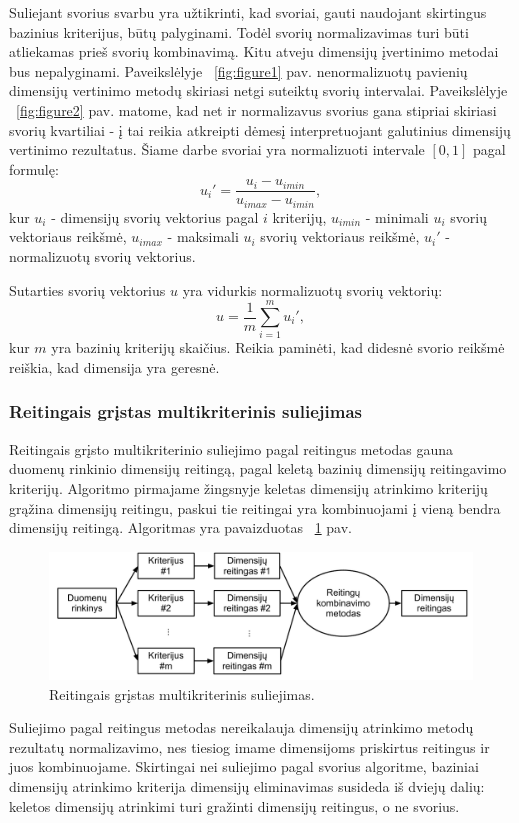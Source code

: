 Suliejant svorius svarbu yra užtikrinti, kad svoriai, gauti naudojant
skirtingus bazinius kriterijus, būtų palyginami. Todėl svorių normalizavimas
turi būti atliekamas prieš svorių kombinavimą. Kitu
atveju dimensijų įvertinimo metodai bus nepalyginami. Paveikslėlyje ~\ref{fig:figure1} pav.
nenormalizuotų pavienių dimensijų vertinimo metodų skiriasi netgi suteiktų
svorių intervalai. Paveikslėlyje ~\ref{fig:figure2} pav. matome,
kad net ir normalizavus svorius gana stipriai skiriasi svorių kvartiliai - į 
tai reikia atkreipti dėmesį interpretuojant galutinius dimensijų vertinimo 
rezultatus. Šiame darbe svoriai yra 
normalizuoti intervale $[0, 1]$ pagal formulę:
\begin{equation}
 u_i'=\frac{u_i - u_{i min}}{u_{i max} - u_{i min}}, 
\end{equation}
kur $u_i$ - dimensijų svorių vektorius pagal $i$ kriterijų, 
$u_{i min}$ - minimali $u_i$ svorių vektoriaus reikšmė,
$u_{i max}$ - maksimali $u_i$ svorių vektoriaus reikšmė,
$u_i'$ - normalizuotų svorių vektorius.

Sutarties svorių vektorius $u$ yra vidurkis normalizuotų svorių vektorių:
\begin{equation}
 u = \frac{1}{m}\sum_{i=1}^m u_i',
\end{equation}
kur $m$ yra bazinių kriterijų skaičius. Reikia paminėti, kad didesnė svorio
reikšmė reiškia, kad dimensija yra geresnė.

\subsubsection{Reitingais grįstas multikriterinis suliejimas}

Reitingais grįsto multikriterinio suliejimo pagal reitingus metodas gauna
duomenų rinkinio dimensijų reitingą,
pagal keletą bazinių dimensijų reitingavimo kriterijų. Algoritmo pirmajame žingsnyje
keletas dimensijų atrinkimo kriterijų grąžina dimensijų reitingu, paskui tie
reitingai yra kombinuojami į vieną bendra dimensijų reitingą.  Algoritmas yra
pavaizduotas ~\ref{fig:figure5} pav.
\begin{figure}
 \centering
 \includegraphics[width=1\textwidth]{images/ranking_based_fusion.pdf}
 \caption{Reitingais grįstas multikriterinis suliejimas.}
 \label{fig:figure5}
\end{figure}
Suliejimo pagal reitingus metodas nereikalauja dimensijų atrinkimo metodų 
rezultatų normalizavimo, nes tiesiog imame dimensijoms priskirtus reitingus ir 
juos kombinuojame. Skirtingai nei suliejimo pagal svorius algoritme, baziniai 
dimensijų atrinkimo kriterija dimensijų eliminavimas\cite{yang2011robust} susideda iš dviejų
dalių: keletos dimensijų atrinkimi turi gražinti dimensijų reitingus, o ne svorius.

